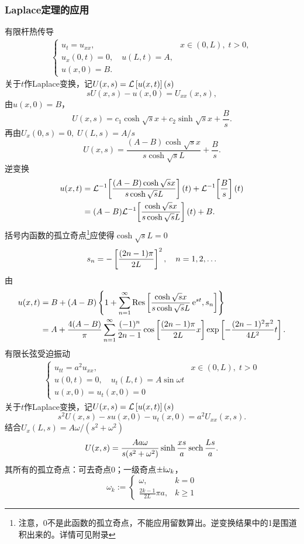 \subsubsection{Laplace定理的应用}
\eg[1] 有限杆热传导
\begin{align*}
	\begin{cases}
		u_t=u_{xx},&x\in(0,L),\;t>0,     \\
		u_x(0,t)=0,\quad u(L,t)=A, \\
		u(x,0)=B.
	\end{cases}
\end{align*}
关于$t$作Laplace变换，记$U(x,s)=\mathcal L\left[u(x,t)\right](s)$
\[s U(x,s)-u(x,0)=U_{xx}(x,s),\]
由$u(x,0)=B$，
\[U(x,s)=c_1\cosh\sqrt s x+c_2\sinh\sqrt s x+\frac Bs.\]
再由$U_x(0,s)=0,\;U(L,s)=A/s$
\[U(x,s)=\frac{(A-B)\cosh\sqrt s x}{s\cosh\sqrt s L}+\frac Bs.\]
逆变换
\begin{align*}
	u(x,t)&=\mathcal L^{-1}\!\left[\frac{(A-B)\cosh\sqrt s x}{s\cosh\sqrt s L}\right](t)+\mathcal L^{-1}\!\left[\frac Bs\right](t)\\
	&=(A-B)\mathcal L^{-1}\!\left[\frac{\cosh\sqrt s x}{s\cosh\sqrt s L}\right](t)+B.
\end{align*}
括号内函数的孤立奇点\footnote{注意，0不是此函数的孤立奇点，不能应用留数算出。逆变换结果中的1是围道积出来的。详情可见附录}应使得$\cosh\sqrt s L=0$
\[s_n=-\left[\frac{(2n-1)\pi}{2L}\right]^2,\quad n=1,2,\ldots\]
由
\begin{align*}
	u(x,t)&=B+(A-B)\left\{1+\sum_{n=1}^{\infty}\operatorname{Res}\left[\frac{\cosh\sqrt s x}{s\cosh\sqrt s L}\mathop{}\!\mathrm{e}^{s t},s_n\right]\right\}\\
	&=A+\frac{4(A-B)}\pi\sum_{n=1}^{\infty}\frac{(-1)^n}{2n-1}\cos\left[\frac{(2n-1)\pi}{2L}x\right]\exp\left[-\frac{(2n-1)^2\pi^2}{4L^2}t\right].
\end{align*}
\eg[2] 有限长弦受迫振动
\begin{align*}
	\begin{cases}
		u_{tt}=a^2u_{xx},&x\in(0,L),\;t>0\\
		u(0,t)=0,\quad u_t(L,t)=A\sin\omega t\\
		u(x,0)=u_t(x,0)=0
	\end{cases}
\end{align*}
关于$t$作Laplace变换，记$U(x,s)=\mathcal L\left[u(x,t)\right](s)$
\[s^2U(x,s)-s u(x,0)-u_t(x,0)=a^2U_{xx}(x,s).\]
结合$U_x(L,s)=A\omega/(s^2+\omega^2)$
\[U(x,s)=\frac{Aa\omega}{s(s^2+\omega^2)}\sinh\frac{xs}a\operatorname{sech}\frac{Ls}a.\]
其所有的孤立奇点：可去奇点0；一级奇点$\pm\mathrm{i}\omega_k$，
\[\omega_k:=\begin{cases}
	\omega,&k=0\\
	\frac{2k-1}{2L}\pi a,&k\geqslant 1
\end{cases}\]
